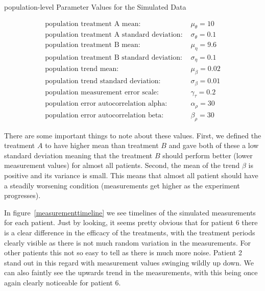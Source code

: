 \documentclass[12pt,a4paper,leqno]{report}
\theoremstyle{plain}
\theoremstyle{definition}
\theoremstyle{remark}
\begin{document}
\begin{table}[H]
    \caption{population-level Parameter Values for the Simulated Data}\label{populationparameters}
    \begin{align}\label{}
        \text{population treatment A mean: } & \mu_{\theta} = 10 \nonumber \\
        \text{population treatment A standard deviation: } & \sigma_{\theta} = 0.1 \nonumber \\
        \text{population treatment B mean: } & \mu_{\eta} = 9.6 \nonumber \\
        \text{population treatment B standard deviation: } & \sigma_{\eta} = 0.1 \nonumber \\
        \text{population trend mean: } & \mu_{\beta} = 0.02 \nonumber \\
        \text{population trend standard deviation: } & \sigma_{\beta} = 0.01 \nonumber \\
        \text{population measurement error scale: } & \gamma_{\tau} = 0.2 \nonumber \\
        \text{population error autocorrelation alpha: } & \alpha_{\rho} = 30 \nonumber \\
        \text{population error autocorrelation beta: } & \beta_{\rho} = 30 \nonumber
    \end{align}
\end{table}

There are some important things to note about these values. First, we defined the
treatment \(A\) to have higher mean than treatment \(B\) and gave both of these a low
standard deviation meaning that the treatment \(B\) should perform better (lower
measurement values) for almost all patients.
Second, the mean of the trend \(\beta \) is positive and its variance is small. This means
that almost all patient should have a steadily worsening condition (measurements get
higher as the experiment progresses).

In figure\ \ref{measurementtimeline} we see timelines of the simulated measurements for
each patient. Just by looking, it seems
pretty obvious that for patient 6 there is a clear difference in the efficacy of the
treatments, with the treatment periods clearly visible as there is not much random
variation in the measurements. For other patients this not so
easy to tell as there is much more noise. Patient 2 stand out in this regard with
measurement values swinging wildly up down.  We can also faintly see the upwards trend in the
measurements, with this being once again clearly noticeable for patient 6.
\end{document}
